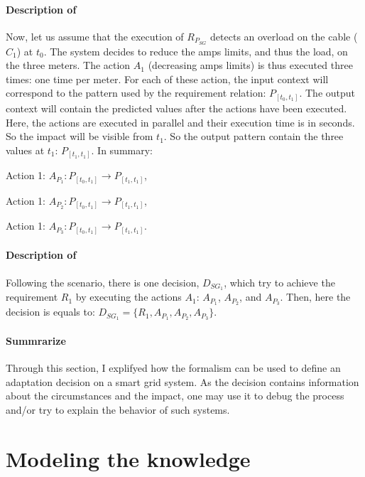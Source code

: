 \paragraph{Description of }
Now, let us assume that the execution of $R_{P_{SG}}$ detects an overload on the cable ($C_1$) at $t_0$.
The system decides to reduce the amps limits, and thus the load, on the three meters.
The action $A_1$ (decreasing amps limits) is thus executed three times: one time per meter.
For each of these action, the input context will correspond to the pattern used by the requirement relation: $P_{[t_0, t_1]}$.
The output context will contain the predicted values after the actions have been executed.
Here, the actions are executed in parallel and their execution time is in seconds.
So the impact will be visible from $t_1$.
So the output pattern contain the three values at $t_1$:  $P_{[t_1, t_1]}$.
In summary:
\begin{condItemize}
	\item Action 1: $A_{P_1}: P_{[t_0, t_1]} \rightarrow P_{[t_1, t_1]}$,
	\item Action 1: $A_{P_2}: P_{[t_0, t_1]} \rightarrow P_{[t_1, t_1]}$,
	\item Action 1: $A_{P_3}: P_{[t_0, t_1]} \rightarrow P_{[t_1, t_1]}$.
\end{condItemize}


\paragraph{Description of }
Following the scenario, there is one decision, $D_{SG_1}$, which try to achieve the requirement $R_1$ by executing the actions $A_1$: $A_{P_1}$, $A_{P_2}$, and $A_{P_3}$.
Then, here the decision is equals to: $D_{SG_1} = \{R_1, A_{P_1}, A_{P_2}, A_{P_3}\}$.

\paragraph{Summrarize}
Through this section, I explifyed how the formalism can be used to define an adaptation decision on a smart grid system.
As the decision contains information about the circumstances and the impact, one may use it to debug the process and/or try to explain the behavior of such systems.

 
 
 
 \section{Modeling the knowledge}
 
